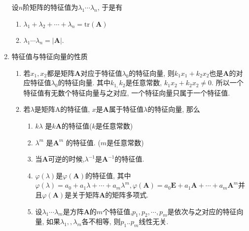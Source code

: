 \begin{enumerate}
设$n$阶矩阵的特征值为$\lambda_{1}\cdots\lambda_{n}$, 于是有
\begin{enumerate}
\item $\lambda_{1}+\lambda_{2}+\cdots+\lambda_{n}=\text{tr}(\boldsymbol{A})$
\item $\lambda_{1}\cdots\lambda_{n}=|\boldsymbol{A}|$. 
\end{enumerate}
\item 特征值与特征向量的性质
\begin{enumerate}
\item 若$x_{1},x_{2}$都是矩阵$\boldsymbol{A}$对应于特征值$\lambda_{0}$的特征向量, 则$k_{1}x_{1}+k_{2}x_{2}$也是$\boldsymbol{A}$的对应特征值$\lambda_{0}$的特征向量.
其中$k_{1,}k_{2}$是任意常数, $k_{1}x_{2}+k_{2}x_{2}\neq0$. 所以一个特征值有无数个特征向量与之对应,
一个特征向量只属于一个特征值. 
\item 若$\lambda$是矩阵A的特征值, $x$是$\boldsymbol{A}$属于特征值$\lambda$的特征向量, 那么
\begin{enumerate}
\item $k\lambda$ 是$k\boldsymbol{A}$的特征值($k$是任意常数)
\item $\lambda^{m}$ 是$\boldsymbol{A}^{m}$ 的特征值. ($m$是任意常数)
\item 当$\boldsymbol{A}$可逆的时候,$\lambda^{-1}$是$\boldsymbol{A}^{-1}$的特征值. 
\item $\varphi(\lambda)$是$\varphi(\boldsymbol{A})$的特征值, 其中$\varphi(\lambda)=a_{0}+a_{1}\lambda+\cdots+a_{m}\lambda^{m},\varphi(\boldsymbol{A})=a_{0}\boldsymbol{E}+a_{1}\boldsymbol{A}+\cdots+a_{m}\boldsymbol{A}^{m}$并且$\varphi(\boldsymbol{A})$是关于矩阵$\boldsymbol{A}$的矩阵多项式. 
\item 设$\lambda_{1}\cdots\lambda_{m}$是方阵$\boldsymbol{A}$的$m$个特征值,$p_{1},p_{2},\cdots,p_{m}$是依次与之对应的特征向量,
如果$\lambda_{1},,\lambda_{m}$各不相等, 则$p_{1}..p_{m}$线性无关.
\end{enumerate}
\end{enumerate}
\end{enumerate}


